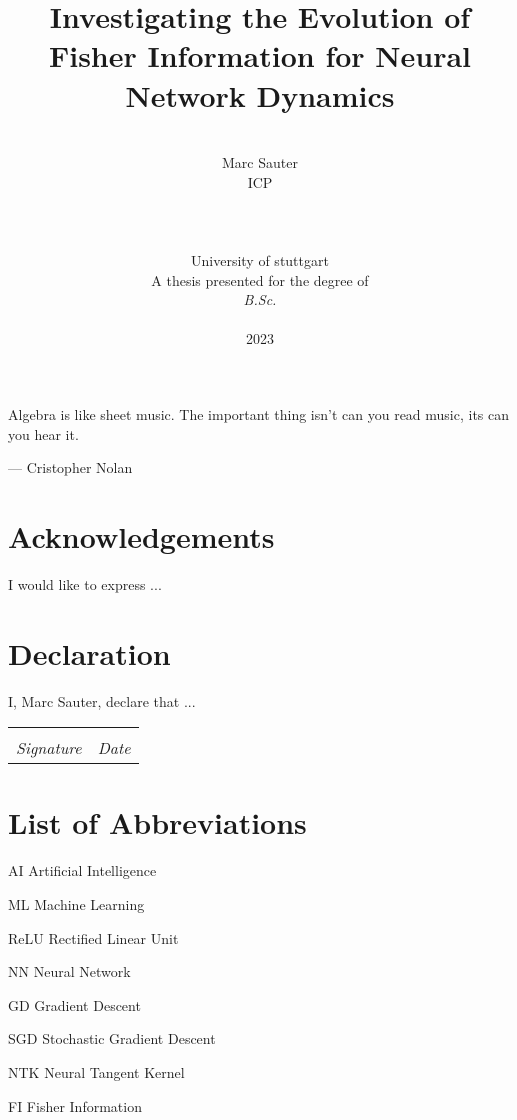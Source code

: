 \documentclass[12pt, twoside, a4paper]{report}
\date{}
\title{Investigating the Evolution of Fisher Information for Neural Network Dynamics}
\author{\\ \Large{Marc Sauter}
	\\ ICP
	\\
	\\
	\\
	\\ University of stuttgart
	\\
	A thesis presented for the degree of \\ \textit{B.Sc.}
	\\ \\
	2023
}
\begin{document}
	\thispagestyle{headings}
	\maketitle
	\FloatBarrier
	
	\newpage
	\thispagestyle{empty}
	\epigraph{Algebra is like sheet music. The important thing isn't can you read music, its can you hear it.}{--- \textup{Cristopher Nolan}}
	
	\thispagestyle{empty}
	\chapter*{Acknowledgements}
	I would like to express ...
	
	
	\thispagestyle{empty}
	\chapter*{Declaration}
	I, Marc Sauter, declare that ...
	
	\vspace{3cm}
	\noindent\begin{tabular}{ll}
		\makebox[2.5in]{\hrulefill} & \makebox[2.5in]{\hrulefill}\\
		\textit{Signature} & \textit{Date}\\
	\end{tabular}
	
	\thispagestyle{empty}
	\begin{abstract}
		\lipsum[1-2]
		
	\end{abstract}
	\tableofcontents
	\thispagestyle{plain}
	
	\chapter*{List of Abbreviations}
	\begin{abbreviations}
		\item[AI] Artificial Intelligence
		\item[ML] Machine Learning
		\item[ReLU] Rectified Linear Unit
		\item[NN] Neural Network
		\item[GD] Gradient Descent
		\item[SGD] Stochastic Gradient Descent
		\item[NTK] Neural Tangent Kernel
		\item[FI] Fisher Information
	\end{abbreviations}	
\end{document}
